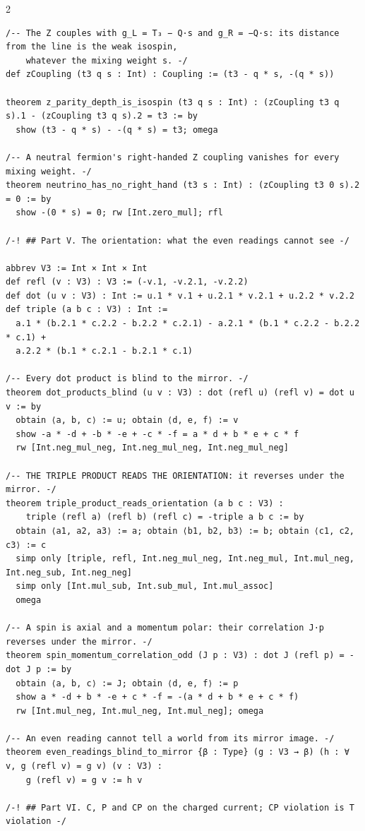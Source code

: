 \documentclass[10pt]{article}
\begin{document}
\begin{multicols}{2}
\begin{Verbatim}[fontsize=\fontsize{6.2}{7.2}\selectfont,breaklines,breakanywhere,breaksymbolleft={}]
/-- The Z couples with g_L = T₃ − Q·s and g_R = −Q·s: its distance from the line is the weak isospin,
    whatever the mixing weight s. -/
def zCoupling (t3 q s : Int) : Coupling := (t3 - q * s, -(q * s))

theorem z_parity_depth_is_isospin (t3 q s : Int) : (zCoupling t3 q s).1 - (zCoupling t3 q s).2 = t3 := by
  show (t3 - q * s) - -(q * s) = t3; omega

/-- A neutral fermion's right-handed Z coupling vanishes for every mixing weight. -/
theorem neutrino_has_no_right_hand (t3 s : Int) : (zCoupling t3 0 s).2 = 0 := by
  show -(0 * s) = 0; rw [Int.zero_mul]; rfl

/-! ## Part V. The orientation: what the even readings cannot see -/

abbrev V3 := Int × Int × Int
def refl (v : V3) : V3 := (-v.1, -v.2.1, -v.2.2)
def dot (u v : V3) : Int := u.1 * v.1 + u.2.1 * v.2.1 + u.2.2 * v.2.2
def triple (a b c : V3) : Int :=
  a.1 * (b.2.1 * c.2.2 - b.2.2 * c.2.1) - a.2.1 * (b.1 * c.2.2 - b.2.2 * c.1) +
  a.2.2 * (b.1 * c.2.1 - b.2.1 * c.1)

/-- Every dot product is blind to the mirror. -/
theorem dot_products_blind (u v : V3) : dot (refl u) (refl v) = dot u v := by
  obtain ⟨a, b, c⟩ := u; obtain ⟨d, e, f⟩ := v
  show -a * -d + -b * -e + -c * -f = a * d + b * e + c * f
  rw [Int.neg_mul_neg, Int.neg_mul_neg, Int.neg_mul_neg]

/-- THE TRIPLE PRODUCT READS THE ORIENTATION: it reverses under the mirror. -/
theorem triple_product_reads_orientation (a b c : V3) :
    triple (refl a) (refl b) (refl c) = -triple a b c := by
  obtain ⟨a1, a2, a3⟩ := a; obtain ⟨b1, b2, b3⟩ := b; obtain ⟨c1, c2, c3⟩ := c
  simp only [triple, refl, Int.neg_mul_neg, Int.neg_mul, Int.mul_neg, Int.neg_sub, Int.neg_neg]
  simp only [Int.mul_sub, Int.sub_mul, Int.mul_assoc]
  omega

/-- A spin is axial and a momentum polar: their correlation J·p reverses under the mirror. -/
theorem spin_momentum_correlation_odd (J p : V3) : dot J (refl p) = -dot J p := by
  obtain ⟨a, b, c⟩ := J; obtain ⟨d, e, f⟩ := p
  show a * -d + b * -e + c * -f = -(a * d + b * e + c * f)
  rw [Int.mul_neg, Int.mul_neg, Int.mul_neg]; omega

/-- An even reading cannot tell a world from its mirror image. -/
theorem even_readings_blind_to_mirror {β : Type} (g : V3 → β) (h : ∀ v, g (refl v) = g v) (v : V3) :
    g (refl v) = g v := h v

/-! ## Part VI. C, P and CP on the charged current; CP violation is T violation -/


\end{Verbatim}
\end{multicols}
\end{document}
